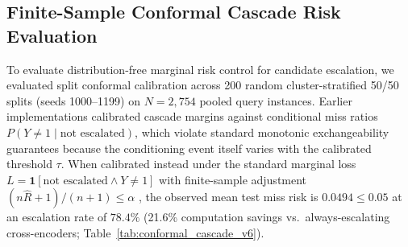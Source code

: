 \documentclass[conference]{IEEEtran}
\begin{document}
\begin{table}[htbp]
\centering
\small
\caption{Production Cross-Encoder Reranker Cascade Ablation (Held-Out Test Split, $N=306$ Probes, Clean Real-OCR).}
\label{tab:practical_stack}
\end{table}

\subsection{Finite-Sample Conformal Cascade Risk Evaluation}
\label{sec:conformal_cascades}
\label{sec:conformal_eval}

To evaluate distribution-free marginal risk control for candidate escalation, we evaluated split conformal calibration across 200 random cluster-stratified 50/50 splits (seeds 1000--1199) on $N=2{,}754$ pooled query instances. Earlier implementations calibrated cascade margins against conditional miss ratios $P(Y \ne 1 \mid \text{not escalated})$, which violate standard monotonic exchangeability guarantees because the conditioning event itself varies with the calibrated threshold $\tau$. When calibrated instead under the standard marginal loss $L = \mathbf{1}[\text{not escalated} \land Y \ne 1]$ with finite-sample adjustment $(n\hat{R}+1)/(n+1) \le \alpha$ \cite{bates2021conformal, angelopoulos2021gentle}, the observed mean test miss risk is $0.0494 \le 0.05$ at an escalation rate of $78.4\%$ (21.6\% computation savings vs.\ always-escalating cross-encoders; Table~\ref{tab:conformal_cascade_v6}).
\end{document}
